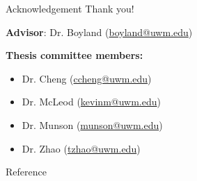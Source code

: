 \begin{frame}{Acknowledgement}{}
    {\huge \alert{Thank you!}}
    
    \emptyline
    
    \emptyline
    
    \textbf{Advisor}: Dr. Boyland (\url{boyland@uwm.edu})
    
    \emptyline
    
    \textbf{Thesis committee members:}
        \begin{itemize}
            \item Dr. Cheng (\url{ccheng@uwm.edu})
            \item Dr. McLeod (\url{kevinm@uwm.edu})
            \item Dr. Munson (\url{munson@uwm.edu})
            \item Dr. Zhao (\url{tzhao@uwm.edu})
        \end{itemize}
    
\end{frame}


\begin{frame}{Reference}{}
{\tiny \fontsize{1.5}{4}\selectfont

{}
}
\end{frame}